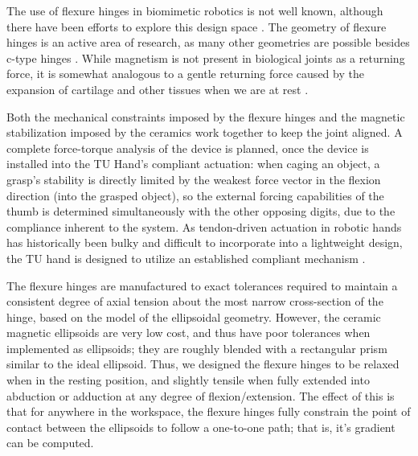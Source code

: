\documentclass[letterpaper, 10 pt, conference]{ieeeconf}
\begin{document}
The use of flexure hinges in biomimetic robotics is not well known, although there have been efforts to explore this design space \cite{havd}. The geometry of flexure hinges is an active area of research, as many other geometries are possible besides c-type hinges \cite{yodel}. While magnetism is not present in biological joints as a returning force, it is somewhat analogous to a gentle returning force caused by the expansion of cartilage and other tissues when we are at rest \cite{santos2006reported}.

Both the mechanical constraints imposed by the flexure hinges and the magnetic stabilization imposed by the ceramics work together to keep the joint aligned. A complete force-torque analysis of the device is planned, once the device is installed into the TU Hand's compliant actuation: when caging an object, a grasp's stability is directly limited by the weakest force vector in the flexion direction (into the grasped object), so the external forcing capabilities of the thumb is determined simultaneously with the other opposing digits, due to the compliance inherent to the system. As tendon-driven actuation in robotic hands has historically been bulky and difficult to incorporate into a lightweight design, the TU hand is designed to utilize an established compliant mechanism \cite{homies}.

The flexure hinges are manufactured to exact tolerances required to maintain a consistent degree of axial tension about the most narrow cross-section of the hinge, based on the model of the ellipsoidal geometry. However, the ceramic magnetic ellipsoids are very low cost, and thus have poor tolerances when implemented as ellipsoids; they are roughly blended with a rectangular prism similar to the ideal ellipsoid. Thus, we designed the flexure hinges to be relaxed when in the resting position, and slightly tensile when fully extended into abduction or adduction at any degree of flexion/extension. The effect of this is that for anywhere in the workspace, the flexure hinges fully constrain the point of contact between the ellipsoids to follow a one-to-one path; that is, it's gradient can be computed.
\end{document}
